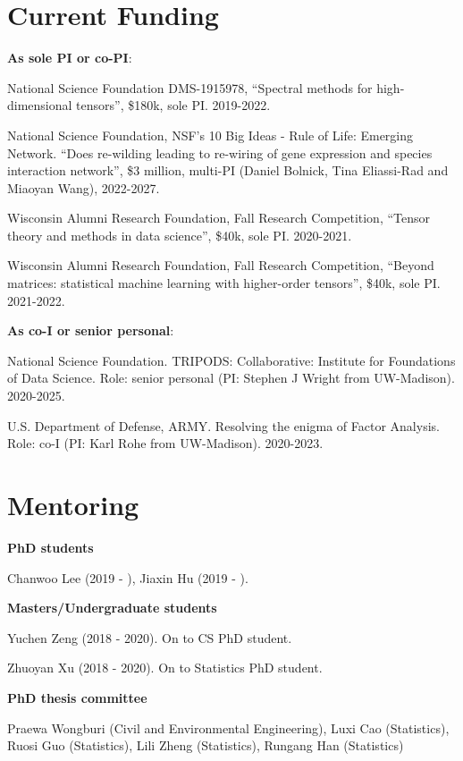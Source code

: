 \documentclass[letterpaper]{article}
\renewenvironment{itemize}{
  \begin{list}{}{
    \setlength{\leftmargin}{1.5em}
  }
}{
  \end{list}
}
\begin{document}
\section*{Current Funding}
{\bf As sole PI or co-PI}:
\begin{itemize}
\item National Science Foundation DMS-1915978, ``Spectral methods for high-dimensional tensors'', \$180k, sole PI. 2019-2022. 
\item National Science Foundation, NSF's 10 Big Ideas - Rule of Life: Emerging Network. ``Does re-wilding leading to re-wiring of gene expression and species interaction network'', \$3 million, multi-PI (Daniel Bolnick, Tina Eliassi-Rad and Miaoyan Wang), 2022-2027.
\item Wisconsin Alumni Research Foundation, Fall Research Competition, ``Tensor theory and methods in data science'', \$40k, sole PI. 2020-2021.
\item Wisconsin Alumni Research Foundation, Fall Research Competition, ``Beyond matrices: statistical machine learning with higher-order tensors'', \$40k, sole PI. 2021-2022.
\end{itemize}
{\bf As co-I or senior personal}:
\begin{itemize}
\item National Science Foundation. TRIPODS: Collaborative: Institute for Foundations of Data Science. Role: senior personal (PI: Stephen J Wright from UW-Madison). 2020-2025. 
\item U.S. Department of Defense, ARMY. Resolving the enigma of Factor Analysis. Role: co-I (PI: Karl Rohe from UW-Madison). 2020-2023. 
\end{itemize}

\section*{Mentoring}
{\bf PhD students}
\begin{itemize}
\item Chanwoo Lee (2019 - ), Jiaxin Hu (2019 - ).
\end{itemize}
{\bf Masters/Undergraduate students} 
\begin{itemize}
\item Yuchen Zeng (2018 - 2020). On to CS PhD student.
\item  Zhuoyan Xu (2018 - 2020). On to Statistics PhD student.
\end{itemize}
{\bf PhD thesis committee}
\begin{itemize}
\item Praewa Wongburi (Civil and Environmental Engineering), Luxi Cao (Statistics), Ruosi Guo (Statistics), Lili Zheng (Statistics), Rungang Han (Statistics)
\end{itemize}
\end{document}
